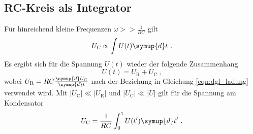 \subsection{RC-Kreis als Integrator}

    Für hinreichend kleine Frequenzen $\omega >> \frac{1}{RC}$ gilt
    \begin{equation*}
        U_\text{C} \propto \int U(t) \symup{d}t \ .
    \end{equation*}
    Es ergibt sich für die Spannung $U(t)$ wieder der folgende Zusammenhang
    \begin{equation}
        U(t) = U_\text{R} + U_\text{C} \ ,
    \end{equation}
    wobei $U_\text{R} = RC \frac{\symup{d}U_\text{C}}{\symup{d}t}$ nach der Beziehung in Gleichung \eqref{eqn:dgl_ladung} verwendet wird.
    Mit $\lvert U_\text{C} \rvert \ll \lvert U_\text{R} \rvert$ und $\lvert U_\text{C} \rvert \ll \lvert U \rvert$ gilt für die Spannung am Kondensator
    \begin{equation}
        U_\text{C} = \frac{1}{RC} \int_0^1 U(t') \symup{d}t' \ .
        \label{eqn:integrator}
    \end{equation}
